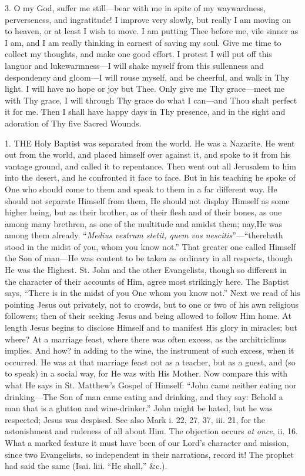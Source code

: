 3. O my God, suffer me
still—bear with me in spite of my waywardness, perverseness, and
ingratitude! I improve very slowly, but really I am moving on to
heaven, or at least I wish to move. I am putting Thee before me, vile
sinner as I am, and I am really thinking in earnest of saving my soul.
Give me time to collect my thoughts, and make one good effort. I protest
I will put off this languor and lukewarmness—I will shake myself from
this sullenness and despondency and gloom—I will rouse myself, and be
cheerful, and walk in Thy light. I will have no hope or joy but Thee.
Only give me Thy grace—meet me with Thy grace, I will through Thy
grace do what I can—and Thou shalt perfect it for me. Then I shall
have happy days in Thy presence, and in the sight and adoration of Thy
five Sacred Wounds.



1. THE
Holy Baptist was separated from the world. He was a Nazarite. He went
out from the world, and placed himself over against it, and spoke to it
from his vantage ground, and called it to repentance. Then went out all
Jerusalem to him into the desert, and he confronted it face to face. But
in his teaching he spoke of One who should come to them and speak to
them in a far different way. He should not separate Himself from them,
He should not display Himself as some higher being, but as their
brother, as of their flesh and of their bones, as one among many
brethren, as one of the multitude and amidst them; nay,\emph{}He was
among them already. ``\emph{Medius vestrum stetit, quem vos nescitis}''—``there\emph{}hath stood in the midst of you, whom you know not.'' That greater one
called Himself the Son of man—He was content to be taken as ordinary
in all respects, though He was the Highest. St. John and the other
Evangelists, though so different in the character of their
accounts of Him, agree most strikingly here. The Baptist says, ``There is
in the midst of you One whom you know not.'' Next we read of his pointing
Jesus out privately, not to crowds, but to one or two of his awn
religious followers; then of their seeking Jesus and being allowed to
follow Him home. At length Jesus begins to disclose Himself and to
manifest His glory in miracles; but where? At a marriage feast, where
there was often excess, as the architriclinus implies. And how? in
adding to the wine, the instrument of such excess, when it occurred. He
was at that marriage feast not as a teacher, but as a guest, and (so to
speak) in a social way, for He was with His Mother. Now compare this
with what He says in St. Matthew's Gospel of Himself: ``John came neither
eating nor drinking—The Son of man came eating and drinking, and they
say: Behold a man that is a glutton and wine-drinker.'' John might be
hated, but he was respected; Jesus was despised. See also Mark i. 22,
27, 37, iii. 21, for the astonishment and rudeness of all about Him. The
objection occurs \emph{at} \emph{once}, ii. 16. What a marked feature it
must have been of our Lord's character and mission, since two
Evangelists, so independent in their narrations, record it! The prophet
had said the same (Isai. liii. ``He shall,'' \&c.).

